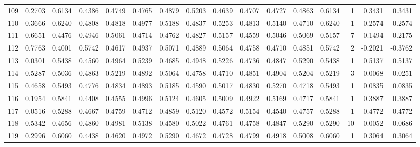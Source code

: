 \begin{tabular}{lrrrrrrrrrrrrrrr}
109 &      0.2703 &  0.6134 &  0.4386 &  0.4749 &  0.4765 &  0.4879 &  0.5203 &  0.4639 &  0.4707 &  0.4727 &   0.4863 &     0.6134 &      1 &                    0.3431 &                     0.3431 \\
110 &      0.3666 &  0.6240 &  0.4808 &  0.4818 &  0.4977 &  0.5188 &  0.4837 &  0.5253 &  0.4813 &  0.5140 &   0.4710 &     0.6240 &      1 &                    0.2574 &                     0.2574 \\
111 &      0.6651 &  0.4476 &  0.4946 &  0.5061 &  0.4714 &  0.4762 &  0.4827 &  0.5157 &  0.4559 &  0.5046 &   0.5069 &     0.5157 &      7 &                   -0.1494 &                    -0.2175 \\
112 &      0.7763 &  0.4001 &  0.5742 &  0.4617 &  0.4937 &  0.5071 &  0.4889 &  0.5064 &  0.4758 &  0.4710 &   0.4851 &     0.5742 &      2 &                   -0.2021 &                    -0.3762 \\
113 &      0.0301 &  0.5438 &  0.4560 &  0.4964 &  0.5239 &  0.4685 &  0.4948 &  0.5226 &  0.4736 &  0.4847 &   0.5290 &     0.5438 &      1 &                    0.5137 &                     0.5137 \\
114 &      0.5287 &  0.5036 &  0.4863 &  0.5219 &  0.4892 &  0.5064 &  0.4758 &  0.4710 &  0.4851 &  0.4904 &   0.5204 &     0.5219 &      3 &                   -0.0068 &                    -0.0251 \\
115 &      0.4658 &  0.5493 &  0.4776 &  0.4834 &  0.4893 &  0.5185 &  0.4590 &  0.5017 &  0.4830 &  0.5270 &   0.4718 &     0.5493 &      1 &                    0.0835 &                     0.0835 \\
116 &      0.1954 &  0.5841 &  0.4408 &  0.4555 &  0.4996 &  0.5124 &  0.4605 &  0.5009 &  0.4922 &  0.5169 &   0.4717 &     0.5841 &      1 &                    0.3887 &                     0.3887 \\
117 &      0.0516 &  0.5288 &  0.4667 &  0.4759 &  0.4712 &  0.4859 &  0.5120 &  0.4572 &  0.5154 &  0.4540 &   0.4757 &     0.5288 &      1 &                    0.4772 &                     0.4772 \\
118 &      0.5342 &  0.4656 &  0.4860 &  0.4981 &  0.5138 &  0.4580 &  0.5022 &  0.4761 &  0.4758 &  0.4847 &   0.5290 &     0.5290 &     10 &                   -0.0052 &                    -0.0686 \\
119 &      0.2996 &  0.6060 &  0.4438 &  0.4620 &  0.4972 &  0.5290 &  0.4672 &  0.4728 &  0.4799 &  0.4918 &   0.5008 &     0.6060 &      1 &                    0.3064 &                     0.3064 \\

\end{tabular}
